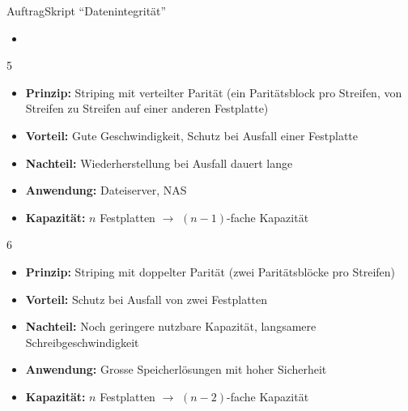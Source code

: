 \begin{frame}{Auftrag}{Skript \enquote{Datenintegrität}}
    \begin{itemize}
        \item {}
    \end{itemize}
\end{frame}


\begin{frame}{ 5}
    \begin{center}
        
    \end{center}
    \begin{itemize}
        \item \textbf{Prinzip:} Striping mit verteilter Parität (ein Paritätsblock pro Streifen, von Streifen zu Streifen auf einer anderen Festplatte)
        \item \textbf{Vorteil:} Gute Geschwindigkeit, Schutz bei Ausfall einer Festplatte
        \item \textbf{Nachteil:} Wiederherstellung bei Ausfall dauert lange
        \item \textbf{Anwendung:} Dateiserver, \gls{NAS}
        \item \textbf{Kapazität:} $n$ Festplatten $\rightarrow$ $(n-1)$-fache Kapazität
    \end{itemize}
\end{frame}

\begin{frame}{ 6}
    \begin{center}
        
    \end{center}
    \begin{itemize}
        \item \textbf{Prinzip:} Striping mit doppelter Parität (zwei Paritätsblöcke pro Streifen)
        \item \textbf{Vorteil:} Schutz bei Ausfall von zwei Festplatten
        \item \textbf{Nachteil:} Noch geringere nutzbare Kapazität, langsamere Schreibgeschwindigkeit
        \item \textbf{Anwendung:} Grosse Speicherlösungen mit hoher Sicherheit
        \item \textbf{Kapazität:} $n$ Festplatten $\rightarrow$ $(n-2)$-fache Kapazität
    \end{itemize}
\end{frame}

